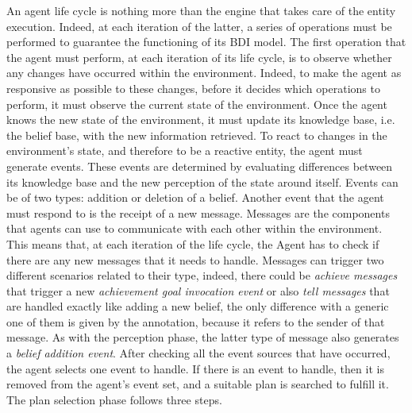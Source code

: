 An agent life cycle is nothing more than the engine that takes care of the entity execution. Indeed, at each iteration of the latter, a series of operations must be performed to guarantee the functioning of its BDI model. The first operation that the agent must perform, at each iteration of its life cycle, is to observe whether any changes have occurred within the environment. Indeed, to make the agent as responsive as possible to these changes, before it decides which operations to perform, it must observe the current state of the environment. Once the agent knows the new state of the environment, it must update its knowledge base, i.e. the belief base, with the new information retrieved. To react to changes in the environment's state, and therefore to be a reactive entity, the agent must generate events. These events are determined by evaluating differences between its knowledge base and the new perception of the state around itself. Events can be of two types: addition or deletion of a belief. Another event that the agent must respond to is the receipt of a new message. Messages are the components that agents can use to communicate with each other within the environment. This means that, at each iteration of the life cycle, the Agent has to check if there are any new messages that it needs to handle. Messages can trigger two different scenarios related to their type, indeed, there could be \textit{achieve messages} that trigger a new \textit{achievement goal invocation event} or also \textit{tell messages} that are handled exactly like adding a new belief, the only difference with a generic one of them is given by the annotation, because it refers to the sender of that message. As with the perception phase, the latter type of message also generates a \textit{belief addition event}. After checking all the event sources that have occurred, the agent selects one event to handle. If there is an event to handle, then it is removed from the agent's event set, and a suitable plan is searched to fulfill it. The plan selection phase follows three steps.

